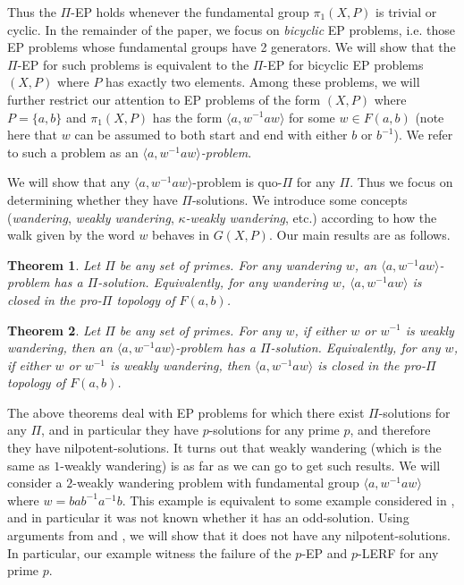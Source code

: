 \documentclass[10pt,a4paper]{amsart}
\newtheorem{theorem}{Theorem}[section]
\theoremstyle{definition}
\theoremstyle{definition}
\numberwithin{equation}{section}
\begin{document}
Thus the $\Pi$-EP holds whenever the fundamental group $\pi_1(X, P)$ is trivial or cyclic. In the remainder of the paper, we focus on \emph{bicyclic} EP problems, i.e. those EP problems whose fundamental groups have 2 generators. We will show that the $\Pi$-EP for such problems is equivalent to the $\Pi$-EP for bicyclic EP problems $(X, P)$ where $P$ has exactly two elements. Among these problems, we will further restrict our attention to EP problems of the form $(X, P)$ where $P=\{a, b\}$ and $\pi_1(X,P)$ has the form $\langle a, w^{-1}aw\rangle$ for some $w\in F(a, b)$ (note here that $w$ can be assumed to both start and end with either $b$ or $b^{-1}$). We refer to such a problem as an \emph{$\langle a, w^{-1}aw\rangle$-problem}. 

We will show that any $\langle a, w^{-1}aw\rangle$-problem is quo-$\Pi$ for any $\Pi$. Thus we focus on determining whether they have $\Pi$-solutions. We introduce some concepts (\emph{wandering}, \emph{weakly wandering}, \emph{$\kappa$-weakly wandering}, etc.) according to how the walk given by the word $w$ behaves in $G(X,P)$. Our main results are as follows.



\begin{theorem}\label{thm:mainwandering} Let $\Pi$ be any set of primes. For any wandering $w$, an $\langle a, w^{-1}aw\rangle$-problem has a $\Pi$-solution. Equivalently, for any wandering $w$, $\langle a, w^{-1}aw\rangle$ is closed in the pro-$\Pi$ topology of $F(a, b)$.
\end{theorem}

\begin{theorem}\label{thm:mainweaklywandering} Let $\Pi$ be any set of primes. For any $w$, if either $w$ or $w^{-1}$ is weakly wandering, then an $\langle a, w^{-1}aw\rangle$-problem has a $\Pi$-solution. Equivalently, for any $w$,  if either $w$ or $w^{-1}$ is weakly wandering, then $\langle a, w^{-1}aw\rangle$ is closed in the pro-$\Pi$ topology of $F(a, b)$.
\end{theorem}

The above theorems deal with EP problems for which there exist $\Pi$-solutions for any $\Pi$, and in particular they have $p$-solutions for any prime $p$, and therefore they have nilpotent-solutions. It turns out that weakly wandering (which is the same as $1$-weakly wandering) is as far as we can go to get such results. We will consider a $2$-weakly wandering problem with fundamental group $\langle a, w^{-1}aw\rangle$ where $w=bab^{-1}a^{-1}b$. This example is equivalent to some example considered in \cite{HPSW19}, and in particular it was not known whether it has an odd-solution. Using arguments from \cite{MSW01} and \cite{HPSW19}, we will show that it does not have any nilpotent-solutions. In particular, our example witness the failure of the $p$-EP and $p$-LERF for any prime $p$.
\end{document}
